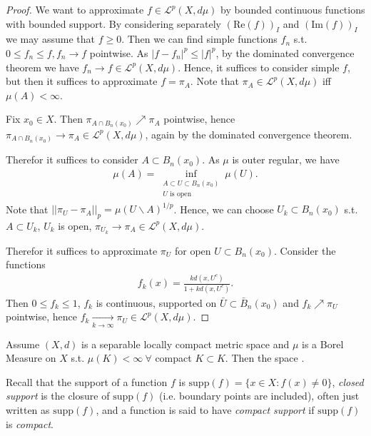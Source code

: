 \begin{proof}
    We want to approximate \(f\in\mathcal{L}^p(X,d\mu)\) by bounded continuous functions with bounded support. By considering separately 
    \((\text{Re}(f))_I\) and \((\text{Im}(f))_I\) we may assume that \(f\geq 0\). Then we can find simple functions \(f_n\) s.t. 
    \(0\leq f_n\leq f, f_n\rightarrow f\) pointwise. As \(\vert  f- f_n\vert^p \leq \vert f\vert^p\), by the dominated convergence theorem
    we have \(f_n\rightarrow f\in\mathcal{L}^p(X,d\mu)\). Hence, it suffices to consider simple \(f\), but then it suffices to approximate
    \(f=\pi_A\). Note that \(\pi_A\in\mathcal{L}^p(X,d\mu)\) iff \(\mu(A)<\infty\). 

    Fix \(x_0\in X\). Then \(\pi_{A\cap B_n(x_0)} \nearrow \pi_A\) pointwise, hence 
    \(\pi_{A\cap B_n(x_0)}\rightarrow \pi_A\in\mathcal{L}^p(X,d\mu)\), again by the dominated convergence theorem. 

    Therefor it suffices to consider \(A\subset B_n(x_0)\). As \(\mu\) is outer regular, we have 
    \begin{align*}
        \mu(A) = \inf_{\substack{A\subset U\subset B_n(x_0) \\ U \text{ is open}}} \mu(U).
    \end{align*}
    Note that \(\vert\vert \pi_U - \pi_A\vert\vert_p = \mu(U\backslash A)^{1/p}\). Hence, we can choose \(U_k\subset B_n(x_0)\) s.t.
    \(A\subset U_k\), \(U_k\) is open, \(\pi_{U_k}\rightarrow \pi_A\in\mathcal{L}^p(X,d\mu)\).

    Therefor it suffices to approximate \(\pi_U\) for open \(U\subset B_n(x_0)\). Consider the functions
    \begin{align*}
        f_k(x) = \frac{kd(x,U^c)}{1+kd(x,U^c)}.
    \end{align*}
    Then \(0\leq f_k\leq 1\), \(f_k\) is continuous, supported on \(\bar{U} \subset \bar{B}_n(x_0)\) and \(f_k\nearrow\pi_U\) pointwise, hence
    \(f_k\xrightarrow[k\rightarrow \infty]{ } \pi_U\in\mathcal{L}^p(X,d\mu)\).
\end{proof}
\fi 
\begin{theorem}
    Assume \((X,d)\) is a separable locally compact metric space and \(\mu\) is a Borel Measure on \(X\) s.t. \(\mu(K)<\infty \ \forall \)
    compact \(K\subset K\). Then the space .
\end{theorem}

Recall that the support of a function \(f\) is \(\text{supp}(f) = \{x\in X: f(x) \neq 0\}\), \emph{closed support} is the closure of 
\(\text{supp}(f)\) (i.e. boundary points
are included), often just written as \(\text{supp}(f)\), and a function is said to have \emph{compact support} if \(\text{supp}(f)\) is
\emph{compact}.

